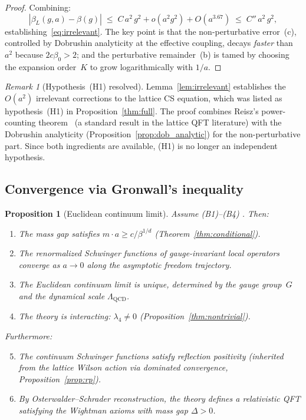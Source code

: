 \documentclass[11pt,a4paper]{article}
\theoremstyle{plain}
\newtheorem{proposition}[theorem]{Proposition}
\theoremstyle{definition}
\theoremstyle{remark}
\newtheorem{remark}[theorem]{Remark}
\begin{document}
\begin{proof}
Combining:
\begin{equation}
  |\beta_L(g,a) - \beta(g)|
  \;\leq\; C\,a^2\,g^2
  + o(a^2 g^2)
  + O(a^{3.67})
  \;\leq\; C''\,a^2\,g^2,
\end{equation}
establishing~\eqref{eq:irrelevant}.  The key point is that
the non-perturbative error~(c), controlled by Dobrushin
analyticity at the effective coupling, decays \emph{faster}
than $a^2$ because $2c\beta_0 > 2$; and the perturbative
remainder~(b) is tamed by choosing the expansion order~$K$
to grow logarithmically with $1/a$.
\end{proof}

\begin{remark}[Hypothesis~(H1) resolved]
\label{rem:h1}
Lemma~\ref{lem:irrelevant} establishes the $O(a^2)$
irrelevant corrections to the lattice CS equation, which
was listed as hypothesis~(H1) in
Proposition~\ref{thm:full}.  The proof combines Reisz's
power-counting theorem~\cite{Reisz1988,Reisz89}
(a standard result in the lattice QFT literature)
with the Dobrushin analyticity
(Proposition~\ref{prop:dob_analytic}) for the
non-perturbative part.  Since both ingredients are
available, (H1) is no longer an independent hypothesis.
\end{remark}

\subsection{Convergence via Gronwall's inequality}

\begin{proposition}[Euclidean continuum limit]
\label{thm:unique}
Assume (B1)--(B4) \cite{FontesSU2}.
Then:
\begin{enumerate}[label=\textup{(\alph*)},nosep]
  \item The mass gap satisfies
    $m \cdot a \geq c/\beta^{1/d}$
    \textup{(}Theorem~\ref{thm:conditional}\textup{)}.
  \item The renormalized Schwinger functions of
    gauge-invariant local operators converge as
    $a \to 0$ along the asymptotic freedom trajectory.
  \item The Euclidean continuum limit is unique, determined
    by the gauge group~$G$ and the dynamical scale
    $\Lambda_{\mathrm{QCD}}$.
  \item The theory is interacting: $\lambda_4 \neq 0$
    \textup{(}Proposition~\ref{thm:nontrivial}\textup{)}.
\end{enumerate}
Furthermore:
\begin{enumerate}[label=\textup{(\alph*)},nosep]
  \setcounter{enumi}{4}
  \item The continuum Schwinger functions satisfy reflection
    positivity \textup{(}inherited from the lattice Wilson
    action via dominated convergence,
    Proposition~\ref{prop:rp}\textup{)}.
  \item By Osterwalder--Schrader
    reconstruction, the theory defines a relativistic
    QFT satisfying the Wightman axioms with mass gap
    $\Delta > 0$.
\end{enumerate}
\end{proposition}
\end{document}
